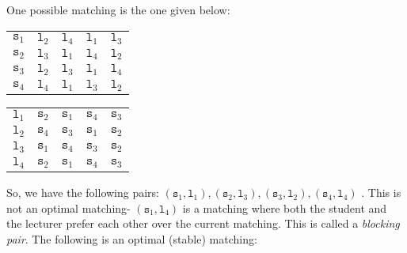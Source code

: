 \documentclass[a4paper, openany]{memoir}
\begin{document}
    \noindent One possible matching is the one given below:
    \begin{table}[H]
        \centering
        \begin{subtable}{0.45\textwidth}
            \centering
            \begin{tabular}{c|cccc}
                $\texttt{s}_1$ & $\texttt{l}_2$ & {\color{red} $\texttt{l}_4$} & \underline{$\texttt{l}_1$} & $\texttt{l}_3$ \\
                $\texttt{s}_2$ & \underline{$\texttt{l}_3$} & $\texttt{l}_1$ & $\texttt{l}_4$ & $\texttt{l}_2$ \\
                $\texttt{s}_3$ & \underline{$\texttt{l}_2$} & $\texttt{l}_3$ & $\texttt{l}_1$ & $\texttt{l}_4$ \\
                $\texttt{s}_4$ & \underline{$\texttt{l}_4$} & $\texttt{l}_1$ & $\texttt{l}_3$ & $\texttt{l}_2$
            \end{tabular}
        \end{subtable}
        \hfill
        \begin{subtable}{0.45\textwidth}
            \centering
            \begin{tabular}{c|cccc}
                $\texttt{l}_1$ & $\texttt{s}_2$ & \underline{$\texttt{s}_1$} & $\texttt{s}_4$ & $\texttt{s}_3$ \\
                $\texttt{l}_2$ & $\texttt{s}_4$ & \underline{$\texttt{s}_3$} & $\texttt{s}_1$ & $\texttt{s}_2$ \\
                $\texttt{l}_3$ & $\texttt{s}_1$ & $\texttt{s}_4$ & $\texttt{s}_3$ & \underline{$\texttt{s}_2$} \\
                $\texttt{l}_4$ & $\texttt{s}_2$ & {\color{red} $\texttt{s}_1$} & \underline{$\texttt{s}_4$} & $\texttt{s}_3$
            \end{tabular}
        \end{subtable}
    \end{table}
    \noindent So, we have the following pairs: $(\texttt{s}_1, \texttt{l}_1), (\texttt{s}_2, \texttt{l}_3), (\texttt{s}_3, \texttt{l}_2), (\texttt{s}_4, \texttt{l}_4)$ . This is not an optimal matching- $(\texttt{s}_1, \texttt{l}_4)$ is a matching where both the student and the lecturer prefer each other over the current matching. This is called a \emph{blocking pair}. The following is an optimal (stable) matching:
\end{document}
